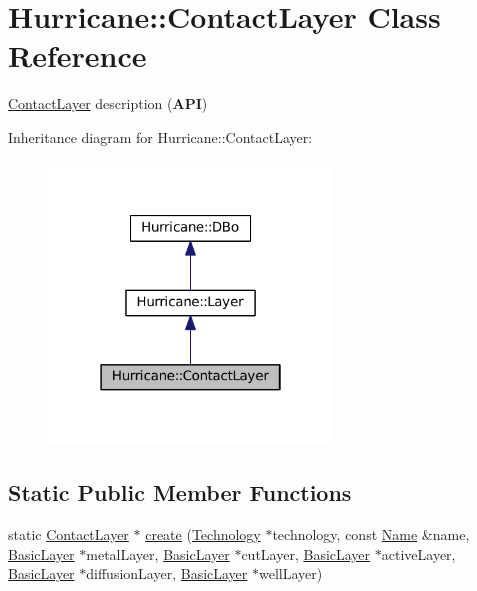 \hypertarget{classHurricane_1_1ContactLayer}{}\section{Hurricane\+:\+:Contact\+Layer Class Reference}
\label{classHurricane_1_1ContactLayer}


\mbox{\hyperlink{classHurricane_1_1ContactLayer}{Contact\+Layer}} description ({\bfseries A\+PI})  




Inheritance diagram for Hurricane\+:\+:Contact\+Layer\+:\nopagebreak
\begin{figure}[H]
\begin{center}
\leavevmode
\includegraphics[width=214pt]{classHurricane_1_1ContactLayer__inherit__graph}
\end{center}
\end{figure}
\subsection*{Static Public Member Functions}
\begin{DoxyCompactItemize}
\item 
static \mbox{\hyperlink{classHurricane_1_1ContactLayer}{Contact\+Layer}} $\ast$ \mbox{\hyperlink{classHurricane_1_1ContactLayer_ab5f2e78865e0311fcabf25e1aa94bf09}{create}} (\mbox{\hyperlink{classHurricane_1_1Technology}{Technology}} $\ast$technology, const \mbox{\hyperlink{classHurricane_1_1Name}{Name}} \&name, \mbox{\hyperlink{classHurricane_1_1BasicLayer}{Basic\+Layer}} $\ast$metal\+Layer, \mbox{\hyperlink{classHurricane_1_1BasicLayer}{Basic\+Layer}} $\ast$cut\+Layer, \mbox{\hyperlink{classHurricane_1_1BasicLayer}{Basic\+Layer}} $\ast$active\+Layer, \mbox{\hyperlink{classHurricane_1_1BasicLayer}{Basic\+Layer}} $\ast$diffusion\+Layer, \mbox{\hyperlink{classHurricane_1_1BasicLayer}{Basic\+Layer}} $\ast$well\+Layer)
\end{DoxyCompactItemize}
